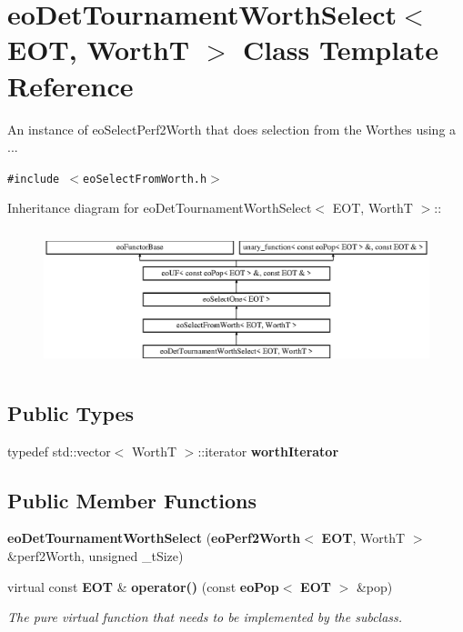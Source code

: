 \section{eo\-Det\-Tournament\-Worth\-Select$<$ EOT, Worth\-T $>$ Class Template Reference}
\label{classeo_det_tournament_worth_select}
An instance of eo\-Select\-Perf2Worth that does selection from the Worthes using a ...  


{\tt \#include $<$eo\-Select\-From\-Worth.h$>$}

Inheritance diagram for eo\-Det\-Tournament\-Worth\-Select$<$ EOT, Worth\-T $>$::\begin{figure}[H]
\begin{center}
\leavevmode
\includegraphics[height=4.04624cm]{classeo_det_tournament_worth_select}
\end{center}
\end{figure}
\subsection*{Public Types}
\begin{CompactItemize}
\item 
typedef std::vector$<$ Worth\-T $>$::iterator {\bf worth\-Iterator}\label{classeo_det_tournament_worth_select_w0}

\end{CompactItemize}
\subsection*{Public Member Functions}
\begin{CompactItemize}
\item 
{\bf eo\-Det\-Tournament\-Worth\-Select} ({\bf eo\-Perf2Worth}$<$ {\bf EOT}, Worth\-T $>$ \&perf2Worth, unsigned \_\-t\-Size)\label{classeo_det_tournament_worth_select_a0}

\item 
virtual const {\bf EOT} \& {\bf operator()} (const {\bf eo\-Pop}$<$ {\bf EOT} $>$ \&pop)\label{classeo_det_tournament_worth_select_a1}

\begin{CompactList}\small\item\em The pure virtual function that needs to be implemented by the subclass. \item\end{CompactList}\end{CompactItemize}
